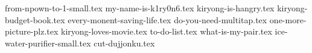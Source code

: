 \documentclass[11pt, aspectratio=169]{beamer}
\begin{document}
    {from-npown-to-1-small.tex}
    {my-name-is-k1ry0n6.tex}
    {kiryong-is-hangry.tex}
    {kiryong-budget-book.tex}
    {every-monent-saving-life.tex}
    {do-you-need-multitap.tex}
    {one-more-picture-plz.tex}
    {kiryong-loves-movie.tex}
    {to-do-list.tex}
    {what-is-my-pair.tex}
    {ice-water-purifier-small.tex}
    {cut-dujjonku.tex}
    
\end{document}
